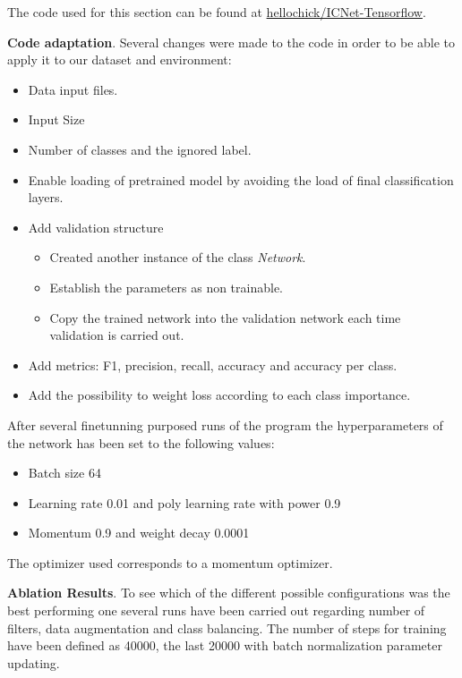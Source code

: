 \documentclass[12pt,a4paper]{article}
\begin{document}
The code used for this section can be found at \href{https://github.com/hellochick/ICNet-tensorflow}{hellochick/ICNet-Tensorflow}.\newline

\textbf{Code adaptation}. Several changes were made to the code in order to be able to apply it to our dataset and environment:

\begin{itemize}
\item Data input files.
\item Input Size
\item Number of classes and the ignored label.
\item Enable loading of pretrained model by avoiding the load of final classification
 layers.
\item Add validation structure
\begin{itemize}
\item Created another instance of the class \textit{Network}. 
\item Establish the parameters as non trainable. 
\item Copy the trained network into the validation network each time validation is carried out. 
\end{itemize}
\item Add metrics:  F1, precision, recall, accuracy and accuracy per class.
\item Add the possibility to weight loss according to each class importance.
\end{itemize}

After several finetunning purposed runs of the program the hyperparameters of the network has been set to the following values:

\begin{itemize}
\item Batch size 64
\item Learning rate 0.01 and poly learning rate with power 0.9
\item Momentum 0.9 and weight decay 0.0001
\end{itemize}

The optimizer used corresponds to a momentum optimizer.\newline

\textbf{Ablation Results}. To see which of the different possible configurations was the best performing one several runs have been carried out regarding number of filters, data augmentation and class balancing. The number of steps for training have been defined as 40000, the last 20000 with batch normalization parameter updating.
\end{document}
